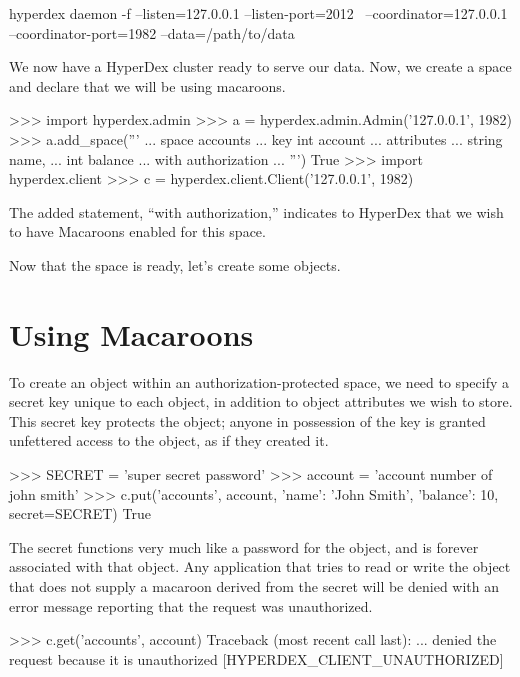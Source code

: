 \begin{consolecode}
hyperdex daemon -f --listen=127.0.0.1 --listen-port=2012 \
                   --coordinator=127.0.0.1 --coordinator-port=1982 --data=/path/to/data
\end{consolecode}

We now have a HyperDex cluster ready to serve our data.  Now, we create a space
and declare that we will be using macaroons.

\begin{pythoncode}
>>> import hyperdex.admin
>>> a = hyperdex.admin.Admin('127.0.0.1', 1982)
>>> a.add_space('''
... space accounts
... key int account
... attributes
...    string name,
...    int balance
... with authorization
... ''')
True
>>> import hyperdex.client
>>> c = hyperdex.client.Client('127.0.0.1', 1982)
\end{pythoncode}

The added statement, ``with authorization,'' indicates to HyperDex that we wish
to have Macaroons enabled for this space.

Now that the space is ready, let's create some objects.

\section{Using Macaroons}

To create an object within an authorization-protected space, we need to specify
a secret key unique to each object, in addition to object attributes we wish to
store.  This secret key protects the object; anyone in possession of the key is
granted unfettered access to the object, as if they created it.

\begin{pythoncode}
>>> SECRET = 'super secret password'
>>> account = 'account number of john smith'
>>> c.put('accounts', account, {'name': 'John Smith', 'balance': 10}, secret=SECRET)
True
\end{pythoncode}

The secret functions very much like a password for the object, and is forever
associated with that object.  Any application that tries to read or write the
object that does not supply a macaroon derived from the secret will be denied
with an error message reporting that the request was unauthorized.

\begin{pythoncode}
>>> c.get('accounts', account)
Traceback (most recent call last):
... denied the request because it is unauthorized [HYPERDEX_CLIENT_UNAUTHORIZED]
\end{pythoncode}

